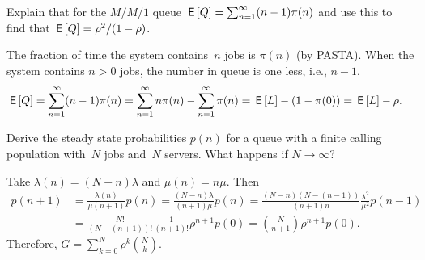 \documentclass[stochastic-or.tex]{subfiles}
\begin{document}
\begin{exercise}
 Explain that for the $M/M/1$ queue $\,\mathsf{E}\left[Q\right] = \sum_{n=1}^\infty (n-1)\pi(n)$ and use this to find that $\,\mathsf{E}\left[Q\right]=\rho^2/(1-\rho)$.
\begin{solution}
 The fraction of time the system contains~$n$ jobs is $\pi(n)$ (by
 PASTA). When the system contains $n>0$ jobs, the number in queue
 is one less, i.e., $n-1$.
\begin{align*}
\,\mathsf{E}\left[Q\right]
&= \sum_{n=1}^\infty (n-1)\pi(n)
=\sum_{n=1}^\infty n\pi(n) -\sum_{n=1}^\infty \pi(n)
= \,\mathsf{E}\left[L\right] - (1-\pi(0)) = \,\mathsf{E}\left[L\right] - \rho.
\end{align*}
\end{solution}
\end{exercise}


\begin{exercise}\label{ex:33}
 Derive the steady state probabilities $p(n)$ for a queue with a finite calling population with~$N$ jobs and~$N$ servers.
  What happens if $N\to\infty$?
\begin{solution}
 Take $\lambda(n) = (N-n)\lambda$ and $\mu(n) = n \mu$. Then
 \begin{align*}
 p(n+1)
&= \frac{\lambda(n)}{\mu(n+1)} p(n)
= \frac{(N-n)\lambda}{(n+1)\mu} p(n)
= \frac{(N-n)(N-(n-1))}{(n+1)n}\frac{\lambda^2}{\mu^2} p(n-1) \\
&= \frac{N!}{(N-(n+1))!}\frac1{(n+1)!}\rho^{n+1} p(0)
 = {N \choose n+1}\rho^{n+1} p(0).
 \end{align*}
Therefore, $G=\sum_{k=0}^N \rho^k { N \choose k}$.
\end{solution}
\end{exercise}
\end{document}
